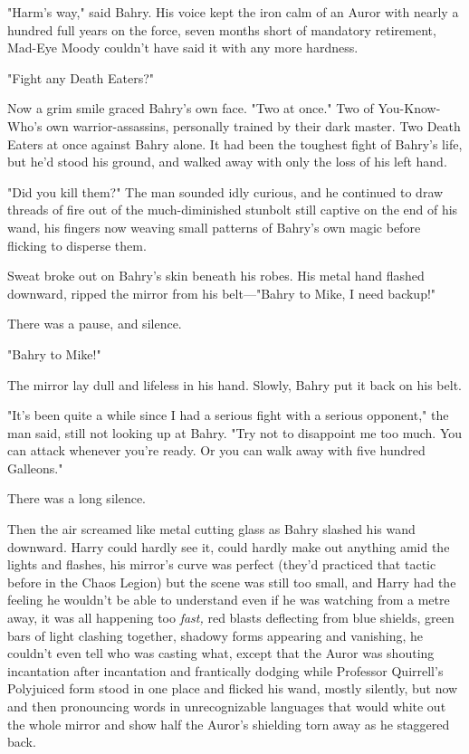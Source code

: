 "Harm's way," said Bahry. His voice kept the iron calm of an Auror with nearly
a hundred full years on the force, seven months short of mandatory retirement,
Mad-Eye Moody couldn't have said it with any more hardness.

"Fight any Death Eaters?"

Now a grim smile graced Bahry's own face. "Two at once." Two of You-Know-Who's
own warrior-assassins, personally trained by their dark master. Two Death
Eaters at once against Bahry alone. It had been the toughest fight of Bahry's
life, but he'd stood his ground, and walked away with only the loss of his left
hand.

"Did you kill them?" The man sounded idly curious, and he continued to draw
threads of fire out of the much-diminished stunbolt still captive on the end of
his wand, his fingers now weaving small patterns of Bahry's own magic before
flicking to disperse them.

Sweat broke out on Bahry's skin beneath his robes. His metal hand flashed
downward, ripped the mirror from his belt---"Bahry to Mike, I need backup!"

There was a pause, and silence.

"Bahry to Mike!"

The mirror lay dull and lifeless in his hand. Slowly, Bahry put it back on his
belt.

"It's been quite a while since I had a serious fight with a serious opponent,"
the man said, still not looking up at Bahry. "Try not to disappoint me too
much. You can attack whenever you're ready. Or you can walk away with five
hundred Galleons."

There was a long silence.

Then the air screamed like metal cutting glass as Bahry slashed his wand
downward.
\later
Harry could hardly see it, could hardly make out anything amid the lights and
flashes, his mirror's curve was perfect (they'd practiced that tactic before in
the Chaos Legion) but the scene was still too small, and Harry had the feeling
he wouldn't be able to understand even if he was watching from a metre away, it
was all happening too \emph{fast,} red blasts deflecting from blue shields,
green bars of light clashing together, shadowy forms appearing and vanishing,
he couldn't even tell who was casting what, except that the Auror was shouting
incantation after incantation and frantically dodging while Professor
Quirrell's Polyjuiced form stood in one place and flicked his wand, mostly
silently, but now and then pronouncing words in unrecognizable languages that
would white out the whole mirror and show half the Auror's shielding torn away
as he staggered back.

